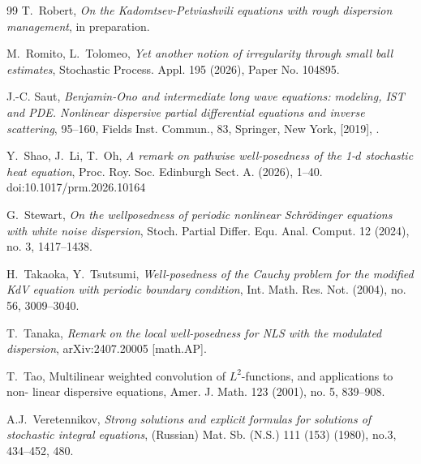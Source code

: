\documentclass[letterpaper, 11pt,  reqno]{amsart}
\newcommand{\1}{\hspace{0.5mm}\text{I}\hspace{0.5mm}}
\numberwithin{equation}{section}
\numberwithin{theorem}{section}
\begin{document}
\begin{thebibliography}{99}
T.~Robert, 
{\it  On the Kadomtsev-Petviashvili equations with rough dispersion management}, 
 in preparation.



M.~Romito, L.~Tolomeo, 
{\it Yet another notion of irregularity through small ball estimates},
 Stochastic Process. Appl. 195 (2026), Paper No. 104895.


%
%
%
	
J.-C. Saut,
 {\it Benjamin-Ono and intermediate long wave equations: modeling, IST and PDE. Nonlinear
dispersive partial differential equations and inverse scattering}, 
95--160, Fields Inst. Commun., 83, Springer, New York, [2019], .
	


%
%


Y.~Shao, J.~Li,  T.~Oh, 
{\it 
A remark on pathwise well-posedness of 
the 1-$d$ stochastic heat equation}, 
 Proc. Roy. Soc. Edinburgh Sect. A. (2026), 1--40. doi:10.1017/prm.2026.10164 




G.~Stewart, 
{\it On the wellposedness of periodic nonlinear Schr\"odinger equations with white noise dispersion}, 
Stoch. Partial Differ. Equ. Anal. Comput. 12 (2024), no. 3, 1417--1438.



H.~Takaoka, Y.~Tsutsumi, 
{\it Well-posedness of the Cauchy problem for the modified KdV equation with periodic boundary condition},
 Int. Math. Res. Not. (2004), no. 56, 3009--3040. 


T.~Tanaka, 
{\it Remark on the local well-posedness for NLS with the modulated dispersion}, 
arXiv:2407.20005 [math.AP].


T.~Tao, 
{Multilinear weighted convolution of $L^2$-functions, and applications to non-
linear dispersive equations}, Amer. J. Math. 123 (2001), no. 5, 839--908.








A.J.~Veretennikov,
{\it Strong solutions and explicit formulas for solutions of stochastic integral equations},
(Russian) Mat. Sb. (N.S.) 111 (153) (1980), no.3, 434--452, 480.






\end{thebibliography}
\end{document}
